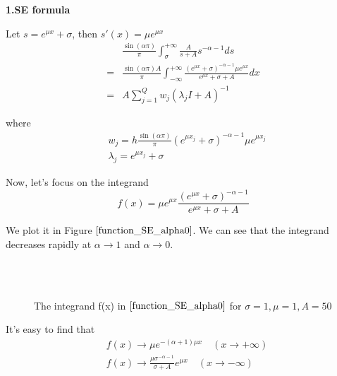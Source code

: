 \textbf{1.SE formula }

Let $s=e^{\mu x}+\sigma$, then $s'(x)=\mu e^{\mu x}$
\begin{equation}
\begin{aligned}
&\frac{\sin(\alpha \pi)}{\pi}\int_{\sigma}^{+\infty}\frac{A}{s+A}s^{-\alpha-1}ds\\
=&\frac{\sin(\alpha \pi)A}{\pi}\int_{-\infty}^{+\infty}\frac{(e^{\mu x}+\sigma)^{-\alpha-1}\mu e^{\mu x}}{e^{\mu x}+\sigma+A}dx\\
=& A\sum_{j=1}^{Q} w_j(\lambda_j I+ A)^{-1}
\end{aligned}
\end{equation}

where
\begin{equation}
\begin{aligned}
& w_j=h\frac{\sin(\alpha \pi)}{\pi}(e^{\mu x_j}+\sigma)^{-\alpha-1}\mu e^{\mu x_j}\\
& \lambda_j=e^{\mu x_j}+\sigma
\end{aligned}
\end{equation}

Now, let's focus on the integrand
\begin{equation}
f(x)=\mu e^{\mu x}\frac{(e^{\mu x}+\sigma)^{-\alpha-1}}{e^{\mu x}+\sigma+A}
\label{function_SE_alpha0}
\end{equation}


We plot it in Figure $\ref{function_SE_alpha0}$. We can see that the integrand decreases rapidly at $\alpha \rightarrow 1$ and $\alpha \rightarrow 0$.

\begin{figure}[htbp]
\centering
{}
~~
~~
\\
~~
~~
  \caption{The integrand f(x) in $\eqref{function_SE_alpha0}$ for $\sigma=1,\mu=1,A=50$}
  \label{function_SE_alpha0}
\end{figure}




It's easy to find that
\begin{equation}
\begin{aligned}
& f(x)\rightarrow \mu e^{-(\alpha+1) \mu x}\quad (x \rightarrow +\infty)\\
& f(x)\rightarrow \frac{\mu \sigma^{-\alpha-1}}{\sigma+A}e^{\mu x}\quad (x \rightarrow -\infty)
\end{aligned}
\end{equation}

